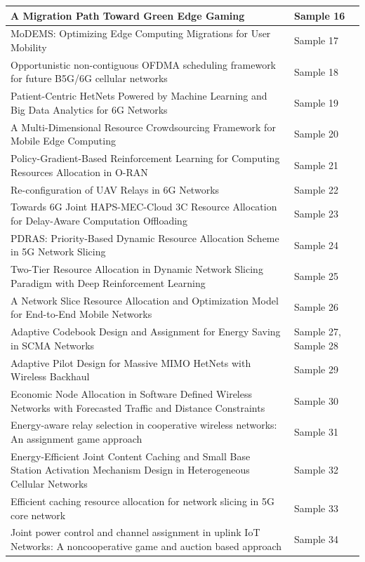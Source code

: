 \documentclass[11pt]{article}
\begin{document}
\begin{table}[htbp]
{\begin{tabular}{|>{\raggedright\arraybackslash}m{13cm}|>{\raggedright\arraybackslash}m{3.5cm}|}
\hline
A Migration Path Toward Green Edge Gaming  & Sample 16\\
\hline
MoDEMS: Optimizing Edge Computing Migrations
for User Mobility  & Sample 17\\
\hline
Opportunistic non-contiguous OFDMA scheduling framework for
future B5G/6G cellular networks  & Sample 18\\
\hline
Patient-Centric HetNets Powered by Machine
Learning and Big Data Analytics for 6G Networks  & Sample 19\\
\hline
A Multi-Dimensional Resource Crowdsourcing
Framework for Mobile Edge Computing  & Sample 20\\
\hline
Policy-Gradient-Based Reinforcement Learning for
Computing Resources Allocation in O-RAN  & Sample 21\\
\hline
Re-configuration of UAV Relays in 6G Networks  & Sample 22\\
\hline
Towards 6G Joint HAPS-MEC-Cloud 3C Resource Allocation for Delay-Aware Computation Offloading  & Sample 23\\
\hline
PDRAS: Priority‑Based Dynamic Resource Allocation
Scheme in 5G Network Slicing  & Sample 24\\
\hline
Two-Tier Resource Allocation in Dynamic Network
Slicing Paradigm with Deep Reinforcement
Learning  & Sample 25\\
\hline
A Network Slice Resource Allocation and
Optimization Model for End-to-End Mobile Networks  & Sample 26\\
\hline
Adaptive Codebook Design and Assignment for
Energy Saving in SCMA Networks  & Sample 27, Sample 28\\
\hline
Adaptive Pilot Design for Massive MIMO HetNets
with Wireless Backhaul  & Sample 29\\
\hline
Economic Node Allocation in Software Defined
Wireless Networks with Forecasted Traffic and
Distance Constraints  & Sample 30\\
\hline
Energy-aware relay selection in cooperative wireless networks: An
assignment game approach  & Sample 31\\
\hline
Energy-Efficient Joint Content Caching and Small
Base Station Activation Mechanism Design in Heterogeneous Cellular Networks  & Sample 32\\
\hline
Efficient caching resource allocation for
network slicing in 5G core network  & Sample 33\\
\hline
Joint power control and channel assignment in uplink IoT Networks: A noncooperative game and auction based approach  & Sample 34\\

\end{tabular}}
\end{table}
\end{document}
